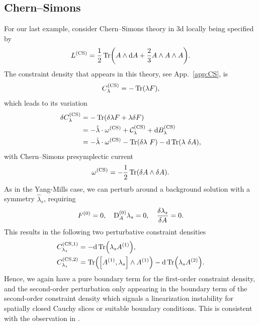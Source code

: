 \documentclass[]{jkpaper}
\theoremstyle{plain}
\theoremstyle{definition}
\newcommand{\sd}{\mathrm {d}}
\def\extd{\mathrm {d}}
\newcommand{\fd}{\delta}
\newcommand{\DD}[1]{\text{D}_A#1}
\begin{document}
\subsection{Chern--Simons}

For our last example, consider Chern--Simons theory in 3d locally being specified by
\begin{equation}
    L^{(\text{CS})} = \frac{1}{2}\Tr(A \wedge \dd{A} + \frac{2}{3} A \wedge A \wedge A).
\end{equation}
The constraint density that appears in this theory, see App.~\ref{app:CS}, is 
\begin{equation}
    C_{\lambda}^{(\text{CS})} = -  \Tr(\lambda F),
\end{equation}
which leads to its variation
\begin{equation}
    \begin{split}
        \delta C^{(\text{CS})}_{\lambda} &= - \Tr(\delta \lambda F + \lambda \delta F) \\
        &=-\hat{\lambda}\cdot \omega^{(\text{CS})} + \mathcal{C}^{(\text{CS})}_{\lambda}+\extd B^{(\text{CS})}_\lambda\\
        &=- \hat{\lambda}\cdot \omega^{(\text{CS})} - \Tr(\delta\lambda~ F)-\sd\Tr(\lambda~ \fd A),
    \end{split}
\end{equation}
with Chern--Simons presymplectic current
\begin{equation}
    \label{eq:CSpresymplcurrent}
    \omega^{(\text{CS})} = - \frac{1}{2} \Tr(\delta A \wedge \delta A).
\end{equation}
As in the Yang-Mills case, we can perturb around a background solution with a symmetry $\hat{\lambda}_s$, requiring
\begin{equation}
    F^{(0)} = 0, \quad \DD^{(0)}\lambda_s = 0, \quad \fdv{\lambda_s}{A} = 0.
\end{equation}
This results in the following two perturbative constraint densities
\begin{align}
    \label{eq:CSconstraint1}
    C_{\lambda_s}^{(\text{CS,1})} &= -  \dd \Tr(\lambda_s A^{(1)}), \\
    C_{\lambda_s}^{(\text{CS,2})} &=  \Tr( \comm{A^{(1)}}{\lambda_s} \wedge A^{(1)})
    -  \dd \Tr(\lambda_s A^{(2)}).
    \label{eq:CSconstraint2}
\end{align}
Hence, we again have a pure boundary term for the first-order constraint density, and the second-order perturbation only appearing in the boundary term of the second-order constraint density which signals a linearization instability for spatially closed Cauchy slices or suitable boundary conditions. This is consistent with the observation in \cite{Khavkine:2013iei}.
\end{document}
